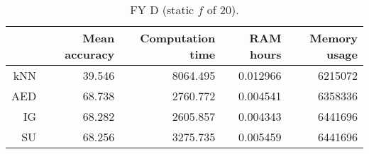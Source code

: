\begin{table}[h]
\centering
\begin{tabular}{r|rrrr}
    & Mean accuracy & Computation time & RAM hours & Memory usage \\ \hline
kNN & 39.546                   & 8064.495         & 0.012966  & 6215072      \\
AED & 68.738                   & 2760.772         & 0.004541  & 6358336      \\
IG  & 68.282                   & 2605.857         & 0.004343  & 6441696      \\
SU  & 68.256                   & 3275.735         & 0.005459  & 6441696       
\end{tabular}
\caption{FY D (static $f$ of 20).}
\label{Table:FY_D}
\end{table}